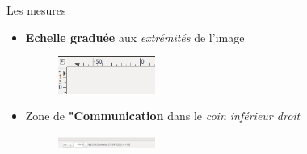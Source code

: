 \documentclass[10pt,svgnames,usenames,table]{beamer}
\begin{document}
\begin{frame}[allowframebreaks]{Les mesures}
\begin{itemize}
	\item \textbf{Echelle graduée} aux \textit{extrémités} de l'image
	
	\begin{figure}
        	\centering
        	\includegraphics[width=0.3\textwidth]{Images/Scale.png} 
        \end{figure}

	\vspace{0.3cm}	
	
	\item Zone de \textbf{"Communication} dans le \textit{coin inférieur droit}

	\begin{figure}
        	\centering
        	\includegraphics[width=0.3\textwidth]{Images/commu.png} 
	\end{figure}
	

\end{itemize}
\end{frame}
\end{document}
